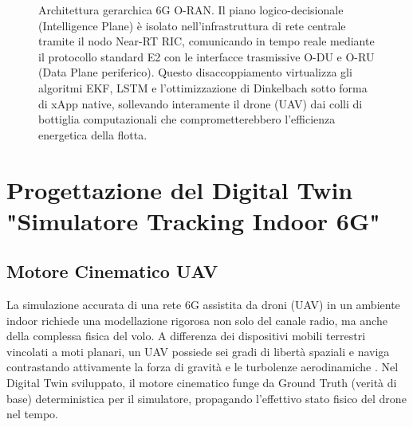 \documentclass[twoside]{article}
\begin{document}
\begin{figure}[H]
{
    }
    \caption{Architettura gerarchica 6G O-RAN. Il piano logico-decisionale (Intelligence Plane) è isolato nell'infrastruttura di rete centrale tramite il nodo Near-RT RIC, comunicando in tempo reale mediante il protocollo standard E2 con le interfacce trasmissive O-DU e O-RU (Data Plane periferico). Questo disaccoppiamento virtualizza gli algoritmi EKF, LSTM e l'ottimizzazione di Dinkelbach sotto forma di xApp native, sollevando interamente il drone (UAV) dai colli di bottiglia computazionali che comprometterebbero l'efficienza energetica della flotta.}
    \label{fig:architettura_oran_ric}
\end{figure}
\clearpage
\section{Progettazione del Digital Twin "Simulatore Tracking Indoor 6G"}
\subsection{Motore Cinematico UAV}

La simulazione accurata di una rete 6G assistita da droni (UAV) in un ambiente indoor richiede una modellazione rigorosa non solo del canale radio, ma anche della complessa fisica del volo. A differenza dei dispositivi mobili terrestri vincolati a moti planari, un UAV possiede sei gradi di libertà spaziali e naviga contrastando attivamente la forza di gravità e le turbolenze aerodinamiche \cite{Muller2024}. Nel Digital Twin sviluppato, il motore cinematico funge da Ground Truth (verità di base) deterministica per il simulatore, propagando l'effettivo stato fisico del drone nel tempo.
\end{document}
